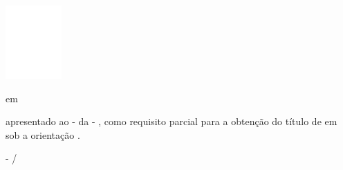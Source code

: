 \begin{center}
	\centerline{\includegraphics[scale=1]{figuras/logo-ufms-cabecalho-em-branco.png}}
	
	\vskip 0.5cm
	
	{\fontsize{14pt}{14pt}\selectfont {\instituicaoTRAB}} \break
	{\fontsize{12pt}{12pt}\selectfont \campusInstituicaoTRAB} \break
	{\fontsize{12pt}{12pt}\selectfont {\grauCursoTRAB } em { \cursoTRAB}}
	
	\vskip 2.5cm
	
	{\fontsize{16pt}{16pt}\selectfont \tituloTRAB}
	
	\vskip 2.5cm
	
	{\fontsize{12pt}{12pt}\selectfont \academicoUmTRAB \break \academicoDoisTRAB \break \academicoTresTRAB}
	
	\vskip 1.5cm

	\hspace{8.5cm}
	\begin{minipage}{7.5cm}
		\fontsize{11pt}{11pt}\selectfont
		{\denominacaoExtensaTrabalhoTRAB } apresentado ao { \campusInstituicaoTRAB } - {\siglaCampusInstituicaoTRAB } da { \instituicaoTRAB } - { \siglaInstituicaoTRAB}, como requisito parcial para a obtenção do título de { \grauFormacaoTRAB } em { \cursoTRAB } sob a orientação { \preposicaoOrientadorTRAB } { \titulcaoOrientadorTRAB } {\nomeOrientadorTRAB}.
	\end{minipage}%
	\vspace*{\fill}
	
	\vspace*{\fill}
	
	{\fontsize{12pt}{12pt}\selectfont {\cidadeTRAB } - {\siglaEstadoTRAB}}
	\break
	{\fontsize{12pt}{12pt}\selectfont \mesTRAB/\anoTRAB}
	
\end{center}
\clearpage
\thispagestyle{empty}
\newpage

